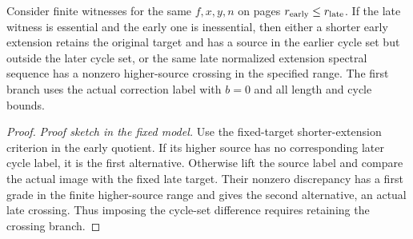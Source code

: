 \begin{theorem}
\label{sem:ProofTools:nonliftable-or-crossing}
Consider finite witnesses for the same $f,x,y,n$ on pages $r_{\rm early}\leq r_{\rm late}$. If the late witness is essential and the early one is inessential, then either a shorter early extension retains the original target and has a source in the earlier cycle set but outside the later cycle set, or the same late normalized extension spectral sequence has a nonzero higher-source crossing in the specified range. The first branch uses the actual correction label with $b=0$ and all length and cycle bounds.
\end{theorem}
\begin{proof}
\textit{Proof sketch in the fixed model.}
Use the fixed-target shorter-extension criterion in the early quotient. If its higher source has no corresponding later cycle label, it is the first alternative. Otherwise lift the source label and compare the actual image with the fixed late target. Their nonzero discrepancy has a first grade in the finite higher-source range and gives the second alternative, an actual late crossing. Thus imposing the cycle-set difference requires retaining the crossing branch.
\end{proof}

